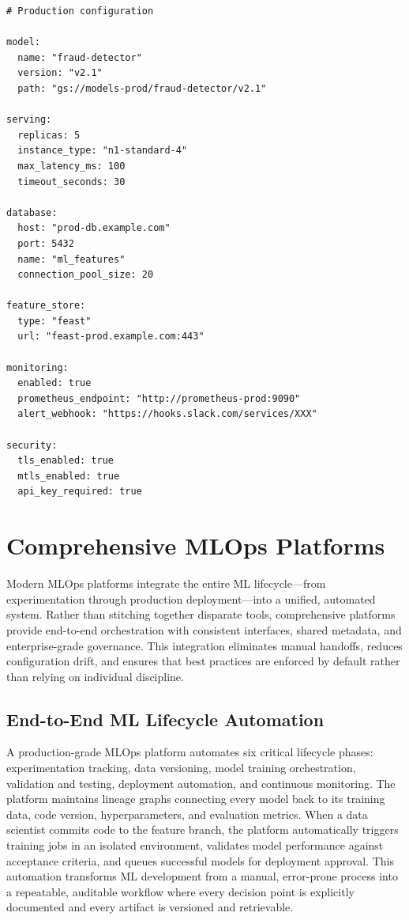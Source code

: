 \begin{lstlisting}[caption={config/production.yaml}]
# Production configuration

model:
  name: "fraud-detector"
  version: "v2.1"
  path: "gs://models-prod/fraud-detector/v2.1"

serving:
  replicas: 5
  instance_type: "n1-standard-4"
  max_latency_ms: 100
  timeout_seconds: 30

database:
  host: "prod-db.example.com"
  port: 5432
  name: "ml_features"
  connection_pool_size: 20

feature_store:
  type: "feast"
  url: "feast-prod.example.com:443"

monitoring:
  enabled: true
  prometheus_endpoint: "http://prometheus-prod:9090"
  alert_webhook: "https://hooks.slack.com/services/XXX"

security:
  tls_enabled: true
  mtls_enabled: true
  api_key_required: true
\end{lstlisting}

\section{Comprehensive MLOps Platforms}

Modern MLOps platforms integrate the entire ML lifecycle---from experimentation through production deployment---into a unified, automated system. Rather than stitching together disparate tools, comprehensive platforms provide end-to-end orchestration with consistent interfaces, shared metadata, and enterprise-grade governance. This integration eliminates manual handoffs, reduces configuration drift, and ensures that best practices are enforced by default rather than relying on individual discipline.

\subsection{End-to-End ML Lifecycle Automation}

A production-grade MLOps platform automates six critical lifecycle phases: experimentation tracking, data versioning, model training orchestration, validation and testing, deployment automation, and continuous monitoring. The platform maintains lineage graphs connecting every model back to its training data, code version, hyperparameters, and evaluation metrics. When a data scientist commits code to the feature branch, the platform automatically triggers training jobs in an isolated environment, validates model performance against acceptance criteria, and queues successful models for deployment approval. This automation transforms ML development from a manual, error-prone process into a repeatable, auditable workflow where every decision point is explicitly documented and every artifact is versioned and retrievable.

